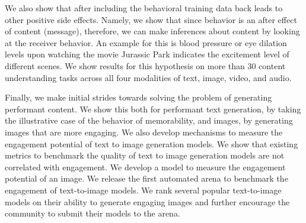 We also show that after including the behavioral training data back leads to other positive side effects. Namely, we show that since behavior is an after effect of content (message), therefore, we can make inferences about content by looking at the receiver behavior. An example for this is blood pressure or eye dilation levels upon watching the movie Jurassic Park indicates the excitement level of different scenes. We show results for this hypothesis on more than 30 content understanding tasks across all four modalities of text, image, video, and audio.


Finally, we make initial strides towards solving the problem of generating performant content. We show this both for performant text generation, by taking the illustrative case of the behavior of memorability, and images, by generating images that are more engaging. We also develop mechanisms to measure the engagement potential of text to image generation models. We show that existing metrics to benchmark the quality of text to image generation models are not correlated with engagement. We develop a model to measure the engagement potential of an image. We release the first automated arena to benchmark the engagement of text-to-image models. We rank several popular text-to-image models on their ability to generate engaging images and further encourage the community to submit their models to the arena.
